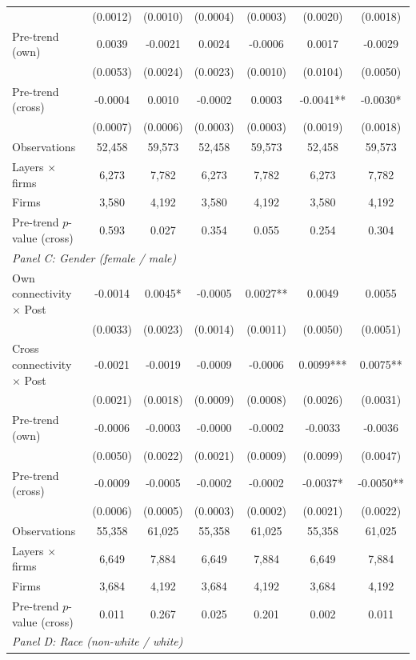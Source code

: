 \begin{table}[H]
{\begin{tabular}{lcccccc}
 & (0.0012) & (0.0010) & (0.0004) & (0.0003) & (0.0020) & (0.0018) \\
\quad Pre-trend (own) & 0.0039 & -0.0021 & 0.0024 & -0.0006 & 0.0017 & -0.0029 \\
 & (0.0053) & (0.0024) & (0.0023) & (0.0010) & (0.0104) & (0.0050) \\
\quad Pre-trend (cross) & -0.0004 & 0.0010 & -0.0002 & 0.0003 & -0.0041** & -0.0030* \\
 & (0.0007) & (0.0006) & (0.0003) & (0.0003) & (0.0019) & (0.0018) \\
\quad Observations & 52,458 & 59,573 & 52,458 & 59,573 & 52,458 & 59,573 \\
\quad Layers $\times$ firms & 6,273 & 7,782 & 6,273 & 7,782 & 6,273 & 7,782 \\
\quad Firms & 3,580 & 4,192 & 3,580 & 4,192 & 3,580 & 4,192 \\
\quad Pre-trend $p$-value (cross) & 0.593 & 0.027 & 0.354 & 0.055 & 0.254 & 0.304 \\[6pt]
\multicolumn{7}{l}{\textit{Panel C: Gender (female / male)}} \\
\quad Own connectivity $\times$ Post & -0.0014 & 0.0045* & -0.0005 & 0.0027** & 0.0049 & 0.0055 \\
 & (0.0033) & (0.0023) & (0.0014) & (0.0011) & (0.0050) & (0.0051) \\
\quad Cross connectivity $\times$ Post & -0.0021 & -0.0019 & -0.0009 & -0.0006 & 0.0099*** & 0.0075** \\
 & (0.0021) & (0.0018) & (0.0009) & (0.0008) & (0.0026) & (0.0031) \\
\quad Pre-trend (own) & -0.0006 & -0.0003 & -0.0000 & -0.0002 & -0.0033 & -0.0036 \\
 & (0.0050) & (0.0022) & (0.0021) & (0.0009) & (0.0099) & (0.0047) \\
\quad Pre-trend (cross) & -0.0009 & -0.0005 & -0.0002 & -0.0002 & -0.0037* & -0.0050** \\
 & (0.0006) & (0.0005) & (0.0003) & (0.0002) & (0.0021) & (0.0022) \\
\quad Observations & 55,358 & 61,025 & 55,358 & 61,025 & 55,358 & 61,025 \\
\quad Layers $\times$ firms & 6,649 & 7,884 & 6,649 & 7,884 & 6,649 & 7,884 \\
\quad Firms & 3,684 & 4,192 & 3,684 & 4,192 & 3,684 & 4,192 \\
\quad Pre-trend $p$-value (cross) & 0.011 & 0.267 & 0.025 & 0.201 & 0.002 & 0.011 \\[6pt]
\multicolumn{7}{l}{\textit{Panel D: Race (non-white / white)}} \\

\end{tabular}}
\end{table}
